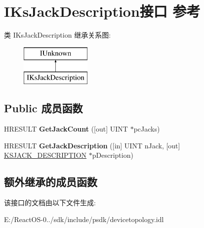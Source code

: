 \hypertarget{interface_i_ks_jack_description}{}\section{I\+Ks\+Jack\+Description接口 参考}
\label{interface_i_ks_jack_description}
类 I\+Ks\+Jack\+Description 继承关系图\+:\begin{figure}[H]
\begin{center}
\leavevmode
\includegraphics[height=2.000000cm]{interface_i_ks_jack_description}
\end{center}
\end{figure}
\subsection*{Public 成员函数}
\begin{DoxyCompactItemize}
\item 
\mbox{\label{interface_i_ks_jack_description_af596c27e1609a761d20501529f8a1ab2}} 
H\+R\+E\+S\+U\+LT {\bfseries Get\+Jack\+Count} (\mbox{[}out\mbox{]} U\+I\+NT $\ast$pc\+Jacks)
\item 
\mbox{\label{interface_i_ks_jack_description_ab8e277c12cbbd55a9745e0b94b9413a6}} 
H\+R\+E\+S\+U\+LT {\bfseries Get\+Jack\+Description} (\mbox{[}in\mbox{]} U\+I\+NT n\+Jack, \mbox{[}out\mbox{]} \hyperlink{struct_k_s_j_a_c_k___d_e_s_c_r_i_p_t_i_o_n}{K\+S\+J\+A\+C\+K\+\_\+\+D\+E\+S\+C\+R\+I\+P\+T\+I\+ON} $\ast$p\+Description)
\end{DoxyCompactItemize}
\subsection*{额外继承的成员函数}


该接口的文档由以下文件生成\+:\begin{DoxyCompactItemize}
\item 
E\+:/\+React\+O\+S-\/0../sdk/include/psdk/devicetopology.\+idl\end{DoxyCompactItemize}
